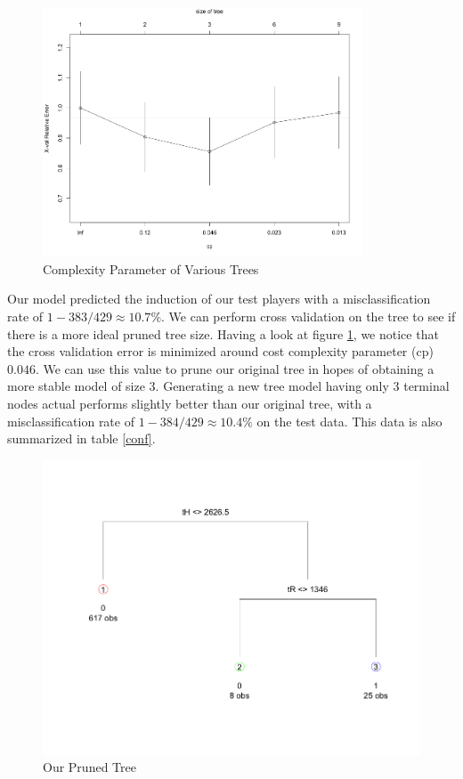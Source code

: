 \documentclass[preprint,12pt]{elsarticle}
\begin{document}
\begin{figure}[h]
       \centering 
       \includegraphics[width=0.85\textwidth]{PlotCP}
       \caption{Complexity Parameter of Various Trees}
       \label{CPlot}
 \end{figure}

Our model predicted the induction of our test players with a misclassification rate of $1 - 383/429 \approx 10.7\%$. We can perform cross validation on the tree to see if there is a more ideal pruned tree size. Having a look at figure \ref{CPlot}, we notice that the cross validation error is minimized around cost complexity parameter (cp) $0.046$. We can use this value to prune our original tree in hopes of obtaining a more stable model of size 3. Generating a new tree model having only 3 terminal nodes actual performs slightly better than our original tree, with a misclassification rate of $1-384/429 \approx 10.4\%$ on the test data. This data is also summarized in table \ref{conf}.

\begin{figure}[h]
       \centering 
       \includegraphics[width=0.75\linewidth]{BattersPruned}
       \caption{Our Pruned Tree}
       \label{pruned}
 \end{figure}
\end{document}
